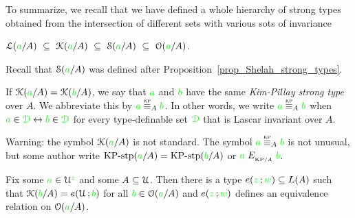 To summarize, we recall that we have defined a whole hierarchy of strong types obtained from the intersection of different sets with various sots of invariance

\hfil$\Ll({\gr a}/A)\ \subseteq\ \K({\gr a}/A)\ \subseteq\ \S({\gr a}/A)\ \subseteq\ \O({\gr a}/A)$. 

Recall that $\EuScript S({\color{green} a}/A)$ was defined after Proposition~\ref{prop_Shelah_strong_types}.

If $\EuScript K({\color{green} a}/A)=\EuScript K({\color{green} b}/A)$, we say that ${\color{green} a}$ and ${\color{green} b}$ have the same \emph{Kim-Pillay strong type\/} over $A$.
We abbreviate this by \emph{${\gr a}\stackrel{\smash{\scalebox{.5}{\rm KP}}}{\equiv}_A{\gr b}$.}
In other words, we write ${\gr a}\equivKP_A{\gr b}$ when ${\color{green} a}\in{\color{green}\EuScript D}\leftrightarrow{\color{green}b}\in{\color{green}\EuScript D}$ for every type-definable set ${\color{green}\EuScript D}$ that is Lascar invariant over $A$.


\noindent\llap{\textcolor{red}{\Large\warning}\kern1.5ex}%
Warning: the symbol $\EuScript K({\color{green} a}/A)$ is not standard.
The symbol ${\gr a}\equivKP_A{\gr b}$ is not unusual, but some author write $\mbox{KP-stp}({\color{green} a}/A)=\mbox{KP-stp}({\color{green} b}/A)$ or ${\color{green} a}\mathrel{E_{_{{\rm KP}/A}}}{\color{green} b}$.

\begin{proposition}\label{prop_bardotto}
  Fix some ${\color{green} a}\in\EuScript U^{\color{green} z}$ and some $A\subseteq\EuScript U$.
Then there is a type $e({\color{green} z}\,;{\color{green} w})\subseteq L(A)$ such that $\EuScript K({\color{green} b}/A)=e(\EuScript U\,;{\color{green} b})$ for all ${\color{green} b}\in\EuScript O({\color{green} a}/A)$ and $e({\color{green} z}\,;{\color{green} w})$ defines an equivalence relation on $\EuScript O({\color{green} a}/A)$.
\end{proposition}

